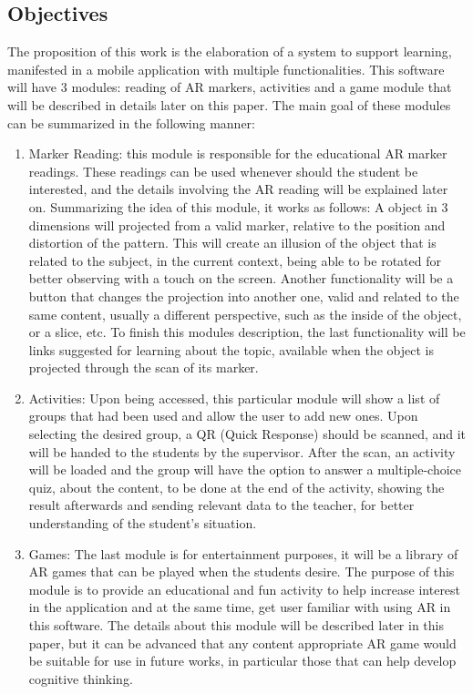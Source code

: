\documentclass[a4paper,twoside]{article}
\begin{document}
\subsection{Objectives}
\noindent The proposition of this work is the elaboration of a system to support learning, manifested in a mobile application with multiple functionalities. This software will have 3 modules: reading of AR markers, activities and a game module that will be described in details later on this paper. The main goal of these modules can be summarized in the following manner:
\begin{enumerate}
\item Marker Reading: this module is responsible for the educational AR marker readings. These readings can be used whenever should the student be interested, and the details involving the AR reading will be explained later on. Summarizing the idea of this module, it works as follows: A object in 3 dimensions will projected from a valid marker, relative to the position and distortion of the pattern. This will create an illusion of the object that is related to the subject, in the current context, being able to be rotated for better observing with a touch on the screen. Another functionality will be a button that changes the projection into another one, valid and related to the same content, usually a different perspective, such as the inside of the object, or a slice, etc. To finish this modules description, the last functionality will be links suggested for learning about the topic, available when the object is projected through the scan of its marker.  

\item Activities: Upon being accessed, this particular module will show a list of groups that had been used and allow the user to add new ones. Upon selecting the desired group, a QR (Quick Response) should be scanned, and it will be handed to the students by the supervisor. After the scan, an activity will be loaded and the group will have the option to answer a multiple-choice quiz, about the content, to be done at the end of the activity, showing the result afterwards and sending relevant data to the teacher, for better understanding of the student's situation.

\item Games: The last module is for entertainment purposes, it will be a library of AR games that can be played when the students desire. The purpose of this module is to provide an educational and fun activity to help increase interest in the application and at the same time, get user familiar with using AR in this software. The details about this module will be described later in this paper, but it can be advanced that any content appropriate AR game would be suitable for use in future works, in particular those that can help develop cognitive thinking.
\end{enumerate}
\end{document}
